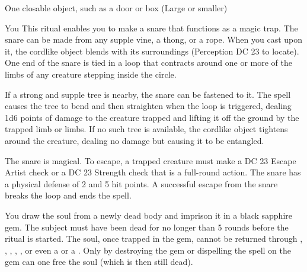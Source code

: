 \begin{spelltarget}{One closable object, such as a door or box (Large or smaller)}
\begin{spelltarget}{You}
\spelleffect This ritual enables you to make a snare that functions as a magic trap. The snare can be made from any supple vine, a thong, or a rope. When you cast  upon it, the cordlike object blends with its surroundings (Perception DC 23 to locate). One end of the snare is tied in a loop that contracts around one or more of the limbs of any creature stepping inside the circle.
\par If a strong and supple tree is nearby, the snare can be fastened to it. The spell causes the tree to bend and then straighten when the loop is triggered, dealing 1d6 points of damage to the creature trapped and lifting it off the ground by the trapped limb or limbs. If no such tree is available, the cordlike object tightens around the creature, dealing no damage but causing it to be entangled.
\par The snare is magical. To escape, a trapped creature must make a DC 23 Escape Artist check or a DC 23 Strength check that is a full-round action. The snare has a physical defense of 2 and 5 hit points. A successful escape from the snare breaks the loop and ends the spell.

\spelleffect You draw the soul from a newly dead body and imprison it in a black sapphire gem. The subject must have been dead for no longer than 5 rounds before the ritual is started. The soul, once trapped in the gem, cannot be returned through , , , , , or even a  or a . Only by destroying the gem or dispelling the spell on the gem can one free the soul (which is then still dead).


\end{spelltarget}
\end{spelltarget}
